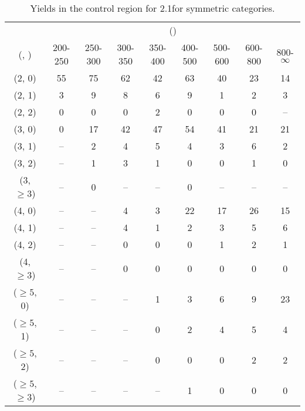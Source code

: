 \begin{table}[h!]
\tiny
\centering
\caption{Yields in the \mmj control region for 2.1\ifb for symmetric categories.\label{tab:yieldssep_mumu_data_sym}}
\begin{tabular}
{ccccccccc}
	\hline\hline
	& \multicolumn{8}{c}{\scalht (\gev)} \\ 
	 (\njet,  \nb) & 200-250 & 250-300 & 300-350 & 350-400 & 400-500 & 500-600 & 600-800 & 800-$\infty$ \\ [0.8ex] 
\hline
	(2, 0) & 55 & 75 & 62 & 42 & 63 & 40 & 23 & 14 \\[0.5ex] 
	(2, 1) & 3 & 9 & 8 & 6 & 9 & 1 & 2 & 3 \\[0.5ex] 
	(2, 2) & 0 & 0 & 0 & 2 & 0 & 0 & 0 & -- \\[0.5ex] 
	(3, 0) & 0 & 17 & 42 & 47 & 54 & 41 & 21 & 21 \\[0.5ex] 
	(3, 1) & -- & 2 & 4 & 5 & 4 & 3 & 6 & 2 \\[0.5ex] 
	(3, 2) & -- & 1 & 3 & 1 & 0 & 0 & 1 & 0 \\[0.5ex] 
	(3, $\ge3$) & -- & 0 & -- & -- & 0 & -- & -- & -- \\[0.5ex] 
	(4, 0) & -- & -- & 4 & 3 & 22 & 17 & 26 & 15 \\[0.5ex] 
	(4, 1) & -- & -- & 4 & 1 & 2 & 3 & 5 & 6 \\[0.5ex] 
	(4, 2) & -- & -- & 0 & 0 & 0 & 1 & 2 & 1 \\[0.5ex] 
	(4, $\ge3$) & -- & -- & 0 & 0 & 0 & 0 & 0 & 0 \\[0.5ex] 
	($\ge5$, 0) & -- & -- & -- & 1 & 3 & 6 & 9 & 23 \\[0.5ex] 
	($\ge5$, 1) & -- & -- & -- & 0 & 2 & 4 & 5 & 4 \\[0.5ex] 
	($\ge5$, 2) & -- & -- & -- & 0 & 0 & 0 & 2 & 2 \\[0.5ex] 
	($\ge5$, $\ge3$) & -- & -- & -- & -- & 1 & 0 & 0 & 0 \\[0.5ex] 
	\hline
	\hline
\end{tabular}
\end{table}

